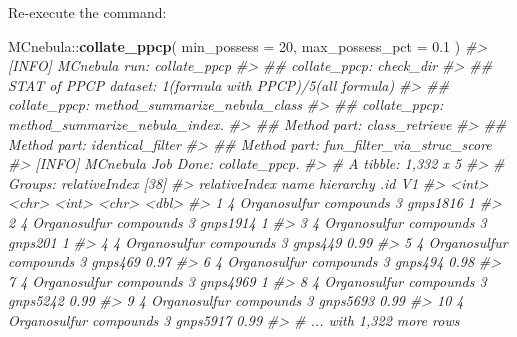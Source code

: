 \documentclass[]{tufte-handout}
\newenvironment{Shaded}{}{}
\newcommand{\CommentTok}[1]{\textcolor[rgb]{0.38,0.63,0.69}{\textit{#1}}}
\newcommand{\DataTypeTok}[1]{\textcolor[rgb]{0.56,0.13,0.00}{#1}}
\newcommand{\DecValTok}[1]{\textcolor[rgb]{0.25,0.63,0.44}{#1}}
\newcommand{\FloatTok}[1]{\textcolor[rgb]{0.25,0.63,0.44}{#1}}
\newcommand{\KeywordTok}[1]{\textcolor[rgb]{0.00,0.44,0.13}{\textbf{#1}}}
\newcommand{\NormalTok}[1]{#1}
\newcommand{\OperatorTok}[1]{\textcolor[rgb]{0.40,0.40,0.40}{#1}}
\begin{document}
Re-execute the command:

\begin{Shaded}
\begin{Highlighting}[]
\NormalTok{MCnebula}\OperatorTok{::}\KeywordTok{collate\_ppcp}\NormalTok{(}
  \DataTypeTok{min\_possess =} \DecValTok{20}\NormalTok{,}
  \DataTypeTok{max\_possess\_pct =} \FloatTok{0.1}
\NormalTok{)}
\CommentTok{\#\textgreater{} [INFO] MCnebula run: collate\_ppcp}
\CommentTok{\#\textgreater{} \#\# collate\_ppcp: check\_dir}
\CommentTok{\#\textgreater{} \#\# STAT of PPCP dataset: 1(formula with PPCP)/5(all formula) }
\CommentTok{\#\textgreater{} \#\# collate\_ppcp: method\_summarize\_nebula\_class}
\CommentTok{\#\textgreater{} \#\# collate\_ppcp: method\_summarize\_nebula\_index.}
\CommentTok{\#\textgreater{} \#\# Method part: class\_retrieve}
\CommentTok{\#\textgreater{} \#\# Method part: identical\_filter}
\CommentTok{\#\textgreater{} \#\# Method part: fun\_filter\_via\_struc\_score}
\CommentTok{\#\textgreater{} [INFO] MCnebula Job Done: collate\_ppcp.}
\CommentTok{\#\textgreater{} \# A tibble: 1,332 x 5}
\CommentTok{\#\textgreater{} \# Groups:   relativeIndex [38]}
\CommentTok{\#\textgreater{}    relativeIndex name                   hierarchy .id         V1}
\CommentTok{\#\textgreater{}            \textless{}int\textgreater{} \textless{}chr\textgreater{}                      \textless{}int\textgreater{} \textless{}chr\textgreater{}    \textless{}dbl\textgreater{}}
\CommentTok{\#\textgreater{}  1             4 Organosulfur compounds         3 gnps1816  1   }
\CommentTok{\#\textgreater{}  2             4 Organosulfur compounds         3 gnps1914  1   }
\CommentTok{\#\textgreater{}  3             4 Organosulfur compounds         3 gnps201   1   }
\CommentTok{\#\textgreater{}  4             4 Organosulfur compounds         3 gnps449   0.99}
\CommentTok{\#\textgreater{}  5             4 Organosulfur compounds         3 gnps469   0.97}
\CommentTok{\#\textgreater{}  6             4 Organosulfur compounds         3 gnps494   0.98}
\CommentTok{\#\textgreater{}  7             4 Organosulfur compounds         3 gnps4969  1   }
\CommentTok{\#\textgreater{}  8             4 Organosulfur compounds         3 gnps5242  0.99}
\CommentTok{\#\textgreater{}  9             4 Organosulfur compounds         3 gnps5693  0.99}
\CommentTok{\#\textgreater{} 10             4 Organosulfur compounds         3 gnps5917  0.99}
\CommentTok{\#\textgreater{} \# ... with 1,322 more rows}
\end{Highlighting}
\end{Shaded}
\end{document}

